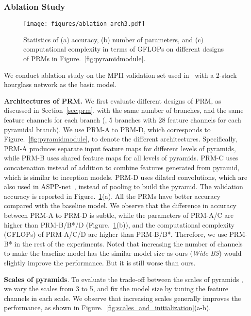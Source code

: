 \documentclass[10pt,twocolumn,letterpaper]{article}
\newcommand{\smalltitle}[1]{\vspace{0.2em}\noindent \textbf{{#1}}}
\begin{document}
\subsubsection{Ablation Study}\label{sec:ablation}
\begin{figure}[t]
\begin{center}
\texttt{[image: figures/ablation\_arch3.pdf]}
\end{center}
   \vspace{-1em}
   \caption{Statistics of (a) accuracy, (b) number of parameters, and (c) computational complexity in terms of GFLOPs on different designs of PRMs in Figure.~\ref{fig:pyramidmodule}.}
\label{fig:ablation_arch}
\vspace{-1em}
\end{figure}

We conduct ablation study on the MPII validation set used in~\cite{tompson2015efficient} with a 2-stack hourglass network as the basic model. 

\smalltitle{Architectures of PRM.} 
We first evaluate different designs of PRM, as discussed in Section~\ref{sec:prm}, with the same number of branches, and the same feature channels for each branch (\eg, 5 branches with 28 feature channels for each pyramidal branch). 
We use PRM-A to PRM-D, which corresponds to Figure.~\ref{fig:pyramidmodule}, to denote the different architectures. 
Specifically, PRM-A produces separate input feature maps for different levels of pyramids, while PRM-B uses shared feature maps for all levels of pyramids. 
PRM-C uses concatenation instead of addition to combine features generated from pyramid, which is similar to inception models. 
PRM-D uses dilated convolutions, which are also used in ASPP-net~\cite{chen2016deeplab}, instead of pooling to build the pyramid. 
The validation accuracy is reported in Figure.~\ref{fig:ablation_arch}(a). 
All the PRMs have better accuracy compared with the baseline model. 
We observe that the difference in accuracy between PRM-A to PRM-D is subtle, while the parameters of PRM-A/C are higher than PRM-B/B*/D (Figure.~\ref{fig:ablation_arch}(b)), and the computational complexity (GFLOPs) of PRM-A/C/D are higher than PRM-B/B*. 
Therefore, we use PRM-B* in the rest of the experiments. 
Noted that increasing the number of channels to make the baseline model has the similar model size as ours (\textit{Wide BS})  would slightly improve the performance. But it is still worse than ours.


\smalltitle{Scales of pyramids}. 
To evaluate the trade-off between the scales of pyramids , we vary the scales from 3 to 5, and fix the model size by tuning the feature channels in each scale.  
We observe that increasing scales generally improves the performance, as shown in Figure.~\ref{fig:scales_and_initialization}(a-b). 
\end{document}
